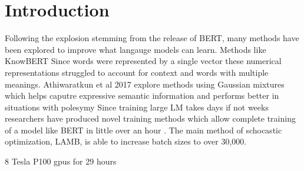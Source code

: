 \documentclass [11pt, proquest] {uwthesis}[2020/08/20]
\begin{document}
\prelimpages



\titlepage  

\setcounter{page}{-1}
 

 


\textpages
\chapter {Introduction}
Following the explosion stemming from the release of BERT, many methods have been explored to improve what langauge models can learn. Methods like KnowBERT \cite{Peters2019KnowledgeEC}
Since words were represented by a single vector these numerical representations struggled to account for context and words with multiple meanings. Athiwaratkun et al 2017 \cite{Athiwaratkun2017MultimodalWD} explore methods using Gaussian mixtures which helps caputre expressive semantic information and performs better in situations with polesymy  
Since training large LM takes days if not weeks researchers have produced novel training methods which allow complete training of a model like BERT in little over an hour \cite{You2019LargeBO}. The main method of schocastic optimization, LAMB, is able to increase batch sizes to over 30,000. 

8 Tesla P100 gpus for 29 hours 
\end{document}
